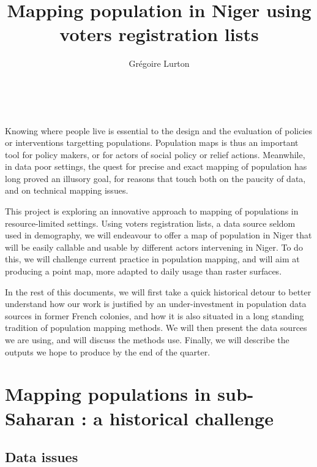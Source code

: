 \documentclass[12pt]{article}\usepackage[]{graphicx}\usepackage[]{color}
\begin{document}
\title{Mapping population in Niger using voters registration lists}
\author{Grégoire Lurton}

\maketitle

\thispagestyle{empty}\


Knowing where people live is essential to the design and the evaluation of policies or interventions targetting populations. Population maps is thus an important tool for policy makers, or for actors of social policy or relief actions. Meanwhile, in data poor settings, the quest for precise and exact mapping of population has long proved an illusory goal, for reasons that touch both on the paucity of data, and on technical mapping issues.

This  project is exploring an innovative approach to mapping of populations in resource-limited settings. Using voters registration lists, a data source seldom used in demography, we will endeavour to offer a map of population in Niger that will be easily callable and usable by different actors intervening in Niger. To do this, we will challenge current practice in population mapping, and will aim at producing a point map, more adapted to daily usage than raster surfaces.

In the rest of this documents, we will first take a quick historical detour to better understand how our work is justified by an under-investment in population data sources in former French colonies, and how it is also situated in a long standing tradition of population mapping methods. We will then present the data sources we are using, and will discuss the methods use. Finally, we will describe the outputs we hope to produce by the end of the quarter.


\section{Mapping populations in sub-Saharan : a historical challenge}

\subsection{Data issues}
\end{document}
